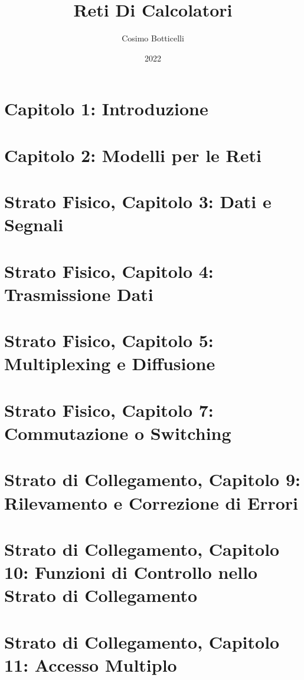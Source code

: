 \documentclass[12pt]{report}
\title{Reti Di Calcolatori}
\author{Cosimo Botticelli}
\date{2022}
\begin{document}
\maketitle
\tableofcontents

\chapter{Capitolo 1: Introduzione}



\chapter{Capitolo 2: Modelli per le Reti}


\chapter{Strato Fisico, Capitolo 3: Dati e Segnali}


\chapter{Strato Fisico, Capitolo 4: Trasmissione Dati}


\chapter{Strato Fisico, Capitolo 5: Multiplexing e Diffusione}


\chapter{Strato Fisico, Capitolo 7: Commutazione o Switching}


\chapter{Strato di Collegamento, Capitolo 9: Rilevamento e Correzione di Errori}


\chapter{Strato di Collegamento, Capitolo 10: Funzioni di Controllo nello Strato di Collegamento}


\chapter{Strato di Collegamento, Capitolo 11: Accesso Multiplo}

\end{document}
